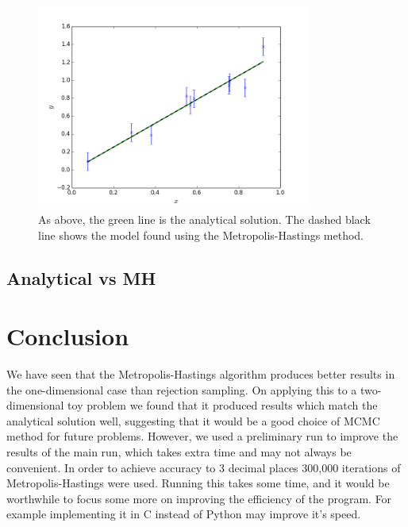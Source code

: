 \documentclass[a4paper,11pt,twoside]{article}
\begin{document}
\begin{figure}[!ht]
	\centering
	\includegraphics[width=0.8\textwidth]{2ddata-mcmc.png}
	\caption{As above, the green line is the analytical solution. The
	dashed black line shows the model found using the Metropolis-Hastings
	method.}
	\label{fig:model-mcmc}
\end{figure}

\subsection{Analytical vs MH}

\section{Conclusion}
We have seen that the Metropolis-Hastings algorithm produces better results in
the one-dimensional case than rejection sampling. On applying this to a
two-dimensional toy problem we found that it produced results which match the
analytical solution well, suggesting that it would be a good choice of MCMC
method for future problems. However, we used a preliminary run to improve the
results of the main run, which takes extra time and may not always be
convenient. In order to achieve accuracy to 3 decimal places 300,000 iterations
of Metropolis-Hastings were used. Running this takes some time, and it would be
worthwhile to focus some more on improving the efficiency of the program. For
example implementing it in C instead of Python may improve it's speed.

\appendix 
\label{appendix}
\end{document}
